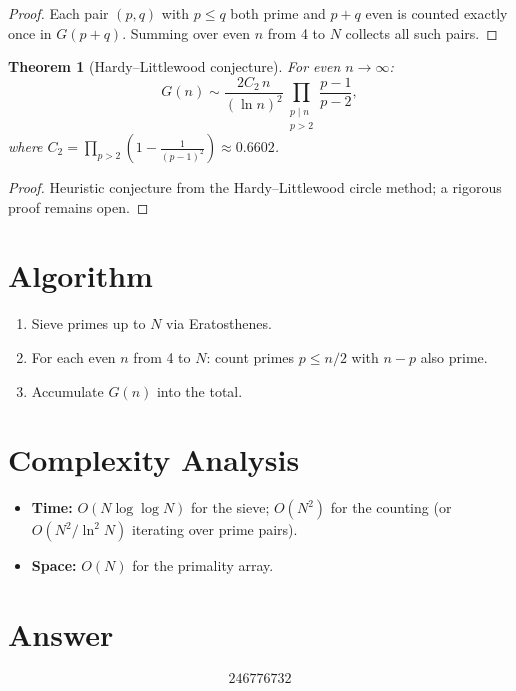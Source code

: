 \documentclass[11pt]{article}
\newtheorem{theorem}{Theorem}
\theoremstyle{definition}
\begin{document}
\begin{proof}
Each pair $(p, q)$ with $p \leq q$ both prime and $p + q$ even is counted exactly once in $G(p + q)$. Summing over even $n$ from 4 to $N$ collects all such pairs.
\end{proof}

\begin{theorem}[Hardy--Littlewood conjecture]
For even $n \to \infty$:
\[
G(n) \sim \frac{2 C_2 \, n}{(\ln n)^2} \prod_{\substack{p \mid n \\ p > 2}} \frac{p - 1}{p - 2},
\]
where $C_2 = \prod_{p > 2}\left(1 - \frac{1}{(p-1)^2}\right) \approx 0.6602$.
\end{theorem}

\begin{proof}
Heuristic conjecture from the Hardy--Littlewood circle method; a rigorous proof remains open.
\end{proof}

\section{Algorithm}

\begin{enumerate}
\item Sieve primes up to $N$ via Eratosthenes.
\item For each even $n$ from 4 to $N$: count primes $p \leq n/2$ with $n - p$ also prime.
\item Accumulate $G(n)$ into the total.
\end{enumerate}

\section{Complexity Analysis}

\begin{itemize}
\item \textbf{Time:} $O(N \log \log N)$ for the sieve; $O(N^2)$ for the counting (or $O(N^2 / \ln^2 N)$ iterating over prime pairs).
\item \textbf{Space:} $O(N)$ for the primality array.
\end{itemize}

\section{Answer}

\[
\boxed{246776732}
\]
\end{document}
